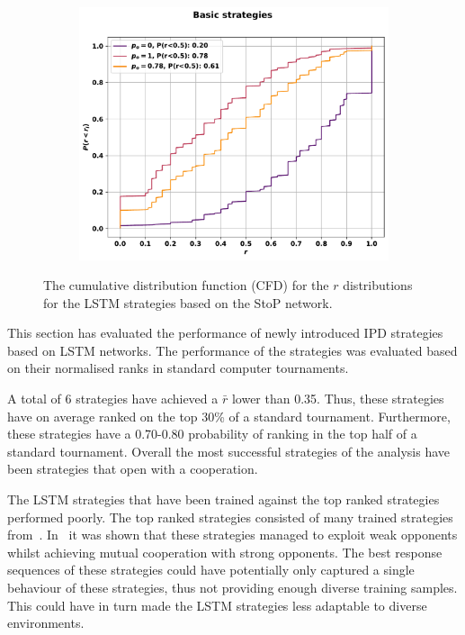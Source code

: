 \begin{figure}[!htbp]
\begin{subfigure}{.5\textwidth}
    \end{subfigure}\hfill
    \begin{subfigure}{.5\textwidth}
    \centering
    \includegraphics[width=.75\textwidth]{src/chapters/07/img/cfd_to_probability_basic_strategies.pdf}
    \end{subfigure}
    \caption{The cumulative distribution function (CFD)
    for the \(r\) distributions for the LSTM strategies based on the StoP
    network.}\label{fig:cfd_s_to_p}
\end{figure}

This section has evaluated the performance of \lstmstrategies newly introduced
IPD strategies based on LSTM networks. The performance of the strategies was
evaluated based on their normalised ranks in \metatournamentslstm standard
computer tournaments.

A total of 6 strategies have achieved a \(\bar{r}\) lower than 0.35. Thus, these
strategies have on average ranked on the top 30\% of a standard tournament.
Furthermore, these strategies have a 0.70-0.80 probability of ranking in the top half of a
standard tournament. Overall the most successful strategies of the analysis have
been strategies that open with a cooperation.

The LSTM strategies that have been trained against the top ranked
strategies performed poorly. The top ranked strategies consisted of many trained
strategies from~\cite{Knight2017}. In~\cite{Knight2017} it was shown that these
strategies managed to exploit weak opponents whilst achieving mutual cooperation
with strong opponents. The best response sequences of these strategies could
have potentially only captured a single behaviour of these strategies, thus not
providing enough diverse training samples. This could have in turn made the LSTM
strategies less adaptable to diverse environments.

